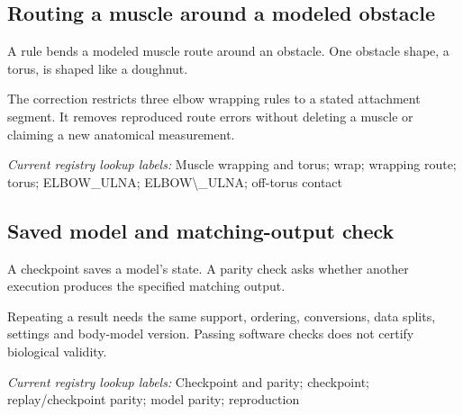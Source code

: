 \begin{samepage}
\subsection*{Routing a muscle around a modeled obstacle}
\noindent A rule bends a modeled muscle route around an obstacle. One obstacle shape, a torus, is shaped like a doughnut.\par
\end{samepage}
\begin{samepage}
\noindent The correction restricts three elbow wrapping rules to a stated attachment segment. It removes reproduced route errors without deleting a muscle or claiming a new anatomical measurement.\par\nopagebreak[4]

\end{samepage}


\noindent\textit{Current registry lookup labels:} Muscle wrapping and torus; wrap; wrapping route; torus; ELBOW\_ULNA; ELBOW\textbackslash{}\_ULNA; off-torus contact\par

\begin{samepage}
\subsection*{Saved model and matching-output check}
\noindent A checkpoint saves a model’s state. A parity check asks whether another execution produces the specified matching output.\par
\end{samepage}
\begin{samepage}
\noindent Repeating a result needs the same support, ordering, conversions, data splits, settings and body-model version. Passing software checks does not certify biological validity.\par\nopagebreak[4]

\end{samepage}


\noindent\textit{Current registry lookup labels:} Checkpoint and parity; checkpoint; replay/checkpoint parity; model parity; reproduction\par

